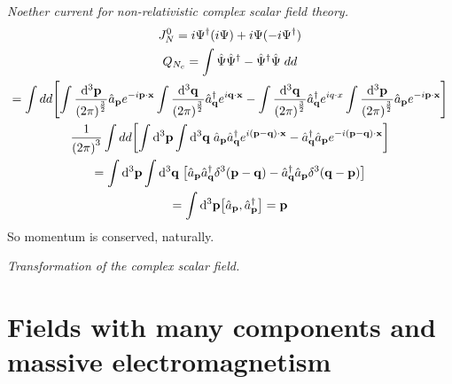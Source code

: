 \documentclass{report}
\begin{document}
\begin{subquests}
	\item \emph{Noether current for non-relativistic complex scalar field theory.}
	\begin{gather*}
		J^0_N = i\Psi^{\dagger}(i\Psi) + i\Psi(-i\Psi^{\dagger}) \\
		Q_{N_c} = \int \hat{\Psi}\hat{\Psi}^{\dagger} - \hat{\Psi}^{\dagger}\hat{\Psi}\;dd \\
		= \int dd\bqty{\int \frac{\dd^3{\vb p}}{\pqty{2\pi}^{\frac{3}{2}}}\hat{a}_{\vb p}e^{-i\vb p\cdot \vb x}\int \frac{\dd^3{\vb q}}{\pqty{2\pi}^{\frac{3}{2}}}\hat{a}^{\dagger}_{\vb q}e^{i\vb q\cdot \vb x} - \int \frac{\dd^3{\vb q}}{\pqty{2\pi}^{\frac{3}{2}}}\hat{a}^{\dagger}_{\vb q}e^{iq\cdot x}\int \frac{\dd^3{\vb p}}{\pqty{2\pi}^{\frac{3}{2}}}\hat{a}_{\vb p}e^{-i\vb p\cdot \vb x}} \\
		\frac{1}{\pqty{2\pi}^3}\int dd\bqty{\int \dd^3{\vb p}\int \dd^3{\vb q}\;\hat{a}_{\vb p}\hat{a}^{\dagger}_{\vb q}e^{i(\vb p - \vb q)\cdot \vb x} - \hat{a}^{\dagger}_{\vb q}\hat{a}_{\vb p}e^{-i(\vb p - \vb q)\cdot \vb x}} \\
		= \int \dd^3{\vb p}\int \dd^3{\vb q}\;\bqty{\hat{a}_{\vb p}\hat{a}^{\dagger}_{\vb q}\delta^3(\vb p - \vb q) - \hat{a}^{\dagger}_{\vb q}\hat{a}_{\vb p}\delta^3(\vb q - \vb p)} \\
		= \int \dd^3{\vb p}\bqty{\hat{a}_{\vb p},\hat{a}^{\dagger}_{\vb p}} = \vb p
	\end{gather*}
	So momentum is conserved, naturally.

	\item \emph{Transformation of the complex scalar field.}
\end{subquests}


\chapter{Fields with many components and massive electromagnetism}
\end{document}
